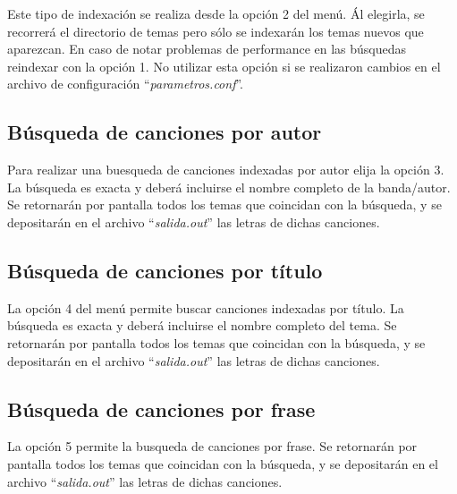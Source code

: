 \documentclass{article}
\begin{document}
	Este tipo de indexación se realiza desde la opción 2 del menú. Ál elegirla, se recorrerá el directorio de temas pero sólo se indexarán los temas nuevos que aparezcan. En caso de notar problemas de performance en las búsquedas reindexar con la opción 1. No utilizar esta opción si se realizaron cambios en el archivo de configuración ``\textit{parametros.conf}''.
\bigskip



\subsection{Búsqueda de canciones por autor}

	Para realizar una buesqueda de canciones indexadas por autor elija la opción 3. La búsqueda es exacta y deberá incluirse el nombre completo de la banda/autor. Se retornarán por pantalla todos los temas que coincidan con la búsqueda, y se depositarán en el archivo ``\textit{salida.out}'' las letras de dichas canciones.
\bigskip



\subsection{Búsqueda de canciones por título}

	La opción 4 del menú permite buscar canciones indexadas por título. La búsqueda es exacta y deberá incluirse el nombre completo del tema. Se retornarán por pantalla todos los temas que coincidan con la búsqueda, y se depositarán en el archivo ``\textit{salida.out}'' las letras de dichas canciones.
\bigskip



\subsection{Búsqueda de canciones por frase}

	La opción 5 permite la busqueda de canciones por frase. Se retornarán por pantalla todos los temas que coincidan con la búsqueda, y se depositarán en el archivo ``\textit{salida.out}'' las letras de dichas canciones.
\bigskip



\end{document}

